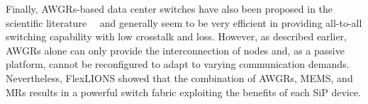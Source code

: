 Finally, AWGRs-based data center switches have also been proposed in the scientific literature~\cite{proietti2018experimental}~\cite{cao2015hi}\cite{cao2015experimental}\cite{yin2013lions}\cite{proietti2013scalable} and generally seem to be very efficient in providing all-to-all switching capability with low crosstalk and loss. However, as described earlier, AWGRs alone can only provide the interconnection of nodes and, as a passive platform, cannot be reconfigured to adapt to varying communication demands. Nevertheless, FlexLIONS showed that the combination of AWGRs, MEMS, and MRs results in a powerful switch fabric exploiting the benefits of each SiP device. 